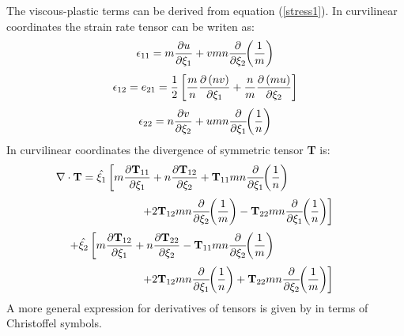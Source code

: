 The viscous-plastic terms can be derived from equation
(\ref{stress1}).  In curvilinear coordinates the strain rate tensor
can be writen as:
\begin{equation}
   \epsilon_{11} = m {\partial u \over \partial \xi_1} +
    vmn {\partial \over \partial \xi_2} \!\! \left( {1 \over m} \right)
\end{equation}
\begin{equation}
   \epsilon_{12} = e_{21} = {1 \over 2} \left[
   {m \over n} {\partial \left( nv \right) \over \partial \xi_1}
   + {n \over m} {\partial \left( mu \right) \over \partial \xi_2}
   \right]
\end{equation}
\begin{equation}
   \epsilon_{22} = n {\partial v \over \partial \xi_2} +
    umn {\partial \over \partial \xi_1} \!\! \left( {1 \over n} \right)
\end{equation}
In curvilinear coordinates the divergence of symmetric tensor {\bf T}
is:
\[
    \nabla \cdot \mbox{\bf T} =
    \hat{\xi_1} \left[ m
    {\partial \mbox{\bf T}_{11} \over \partial \xi_1}
    + n {\partial \mbox{\bf T}_{12} \over \partial \xi_2}
    + \mbox{\bf T}_{11} mn {\partial \over \partial \xi_1} \!\!
    \left( {1 \over n} \right) \right. \mbox{\hspace{2 cm}}
\]
\[
    \mbox{\hspace{2 cm}} \left. + 2 \mbox{\bf T}_{12} mn
    {\partial \over \partial \xi_2} \!\! \left( {1 \over m} \right)
    - \mbox{\bf T}_{22} mn
    {\partial \over \partial \xi_1} \!\! \left( {1 \over n} \right)
    \right]
\]
\[
    + \hat{\xi_2} \left[ m
    {\partial \mbox{\bf T}_{12} \over \partial \xi_1}
    + n {\partial \mbox{\bf T}_{22} \over \partial \xi_2}
    - \mbox{\bf T}_{11} mn {\partial \over \partial \xi_2} \!\!
    \left( {1 \over m} \right) \right. \mbox{\hspace{2 cm}}
\]
\begin{equation}
    \mbox{\hspace{2 cm}} \left. + 2 \mbox{\bf T}_{12} mn
    {\partial \over \partial \xi_1} \!\! \left( {1 \over n} \right)
    + \mbox{\bf T}_{22} mn
    {\partial \over \partial \xi_2} \!\! \left( {1 \over m} \right)
    \right]
\end{equation}
A more general expression for derivatives of tensors is given by
\cite{Aris} in terms of Christoffel symbols.

